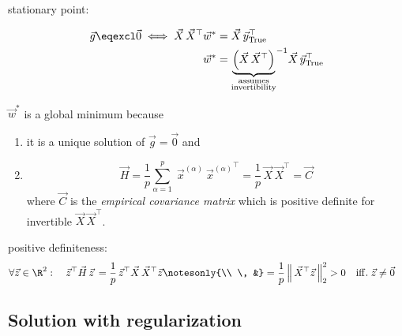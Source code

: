 \begin{frame}


stationary point:

\begin{align}
\vec g \eqexcl \vec 0 \iff \vec X \, \vec X^\top \vec w^*  &= \vec X\, \vec y_{\text{True}}^\top\\
\vec w^* &=
{
\underbrace{
\left(
\vec X \, \vec X^\top
\right)
}_{\substack{\text{assumes}\\ \text{invertibility}}} 
}^{-1} \vec X\, \vec y_{\text{True}}^\top
\end{align}

$\vec w^*$ is a global minimum because
\pause
\begin{enumerate}[1\notesonly{.}]
\item it is a unique solution of $\vec g = \vec 0$ and
\item 
\begin{equation}
\vec H 
= \frac{1}{p} \sum_{\alpha=1}^{p} \;
\vec x^{(\alpha)}~{\vec x^{(\alpha)}}^\top 
= \frac{1}{p} \, \vec X \, \vec X^\top = \vec C
\end{equation}
where $\vec C$ is the \emph{empirical covariance matrix} which is positive definite for invertible $\vec X\, \vec X^\top$.
\end{enumerate}

\pause
positive definiteness:
\begin{align}
\forall \vec z \in \R^2: \quad \vec z^\top \vec H\, \vec z 
\, &= \frac{1}{p} \, \vec z^\top \vec X \, \vec X^\top \vec z\notesonly{\\
\, &}= \frac{1}{p} \, \Big \lVert \, \vec X^\top \vec z \, \Big \rVert_2^2 > 0 \quad \mathrm{iff.} \; \vec z \ne \vec 0
\end{align}

\end{frame}

\subsection{Solution with regularization}

